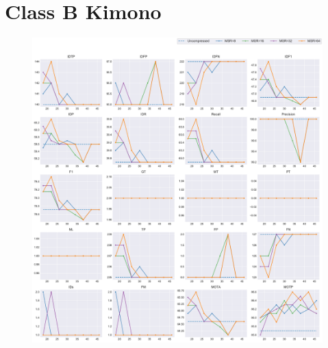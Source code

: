 
\section{Class B Kimono}
\label{sec:appendix/Kimono_all}


\begin{figure}[!htbp]
\centering
\includegraphics[width=1.0\linewidth]{img/appendix/Kimono_all_multiplots_qp.pdf}
\caption[Result of all object classes in Class B Kimono with Horizontal Axis of QP]{}
\label{fig:Kimono_all_qp}
\end{figure}

